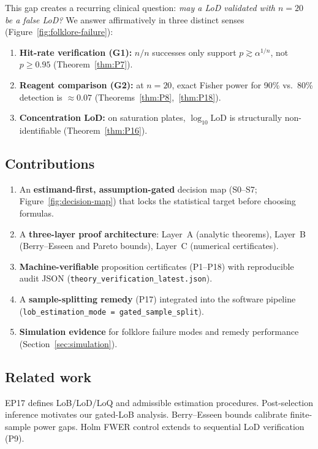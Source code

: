 \documentclass[11pt,a4paper]{article}
\theoremstyle{definition}
\begin{document}
This gap creates a recurring clinical question: \emph{may a LoD validated with
$n=20$ be a false LoD?} We answer affirmatively in three distinct senses
(Figure~\ref{fig:folklore-failure}):
\begin{enumerate}
  \item \textbf{Hit-rate verification (G1):} $n/n$ successes only support
        $p \gtrsim \alpha^{1/n}$, not $p \ge 0.95$ (Theorem~\ref{thm:P7}).
  \item \textbf{Reagent comparison (G2):} at $n=20$, exact Fisher power for
        90\% vs.\ 80\% detection is $\approx 0.07$ (Theorems~\ref{thm:P8},~\ref{thm:P18}).
  \item \textbf{Concentration LoD:} on saturation plates, $\log_{10}\mathrm{LoD}$
        is structurally non-identifiable (Theorem~\ref{thm:P16}).
\end{enumerate}

\subsection{Contributions}

\begin{enumerate}
  \item An \textbf{estimand-first, assumption-gated} decision map (S0--S7;
        Figure~\ref{fig:decision-map}) that locks the statistical target before
        choosing formulas.
  \item A \textbf{three-layer proof architecture}: Layer~A (analytic theorems),
        Layer~B (Berry--Esseen and Pareto bounds), Layer~C (numerical certificates).
  \item \textbf{Machine-verifiable} proposition certificates (P1--P18) with
        reproducible audit JSON (\texttt{theory\_verification\_latest.json}).
  \item A \textbf{sample-splitting remedy} (P17) integrated into the software
        pipeline (\texttt{lob\_estimation\_mode = gated\_sample\_split}).
  \item \textbf{Simulation evidence} for folklore failure modes and remedy performance
        (Section~\ref{sec:simulation}).
\end{enumerate}

\subsection{Related work}

EP17 \cite{ep17} defines LoB/LoD/LoQ and admissible estimation procedures.
Post-selection inference \cite{berk} motivates our gated-LoB analysis.
Berry--Esseen bounds \cite{shevtsova} calibrate finite-sample power gaps.
Holm \cite{holm} FWER control extends to sequential LoD verification (P9).
\end{document}

